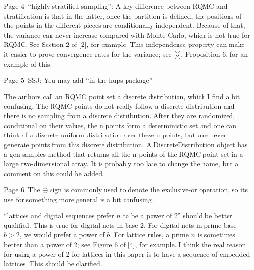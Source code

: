 \documentclass{amsart}
\begin{document}
Page 4, ``highly stratified sampling'': A key difference between RQMC and stratification is that in the latter, once the partition is defined, the positions of the points in the different pieces are conditionally independent. Because of that, the variance can never increase compared with Monte Carlo, which is not true for RQMC. See Section 2 of [2], for example. This independence property can make it easier to prove convergence rates for the variance; see
[3], Proposition 6, for an example of this. 


\vspace{1cm}

Page 5, SSJ: You may add “in the hups package”.

\vspace{1cm}

The authors call an RQMC point set a discrete distribution, which I find a bit confusing. The
RQMC points do not really follow a discrete distribution and there is no sampling from a discrete distribution. After they are randomized, conditional on their values, the n points form a deterministic set and one can think of a discrete uniform distribution over these n points, but one never generate points from this discrete distribution. A DiscreteDistribution object has a gen samples method that returns all the n points of the RQMC point set in a
large two-dimensional array. It is probably too late to change the name, but a comment on this could be added.


\vspace{1cm}

Page 6: The $\oplus$ sign is commonly used to denote the exclusive-or operation, so its use for
something more general is a bit confusing.


\vspace{1cm}

``lattices and digital sequences prefer $n$ to be a power of 2'' should be better qualified. This is true for digital nets in base 2. For digital nets in prime base $b > 2$, we would prefer a power of $b$. For lattice rules, a prime $n$ is sometimes better than a power of 2; see Figure 6 of [4], for example. I think the real reason for using a power of 2 for lattices in this paper is to have a sequence of embedded lattices. This should be clarified.
\end{document}
